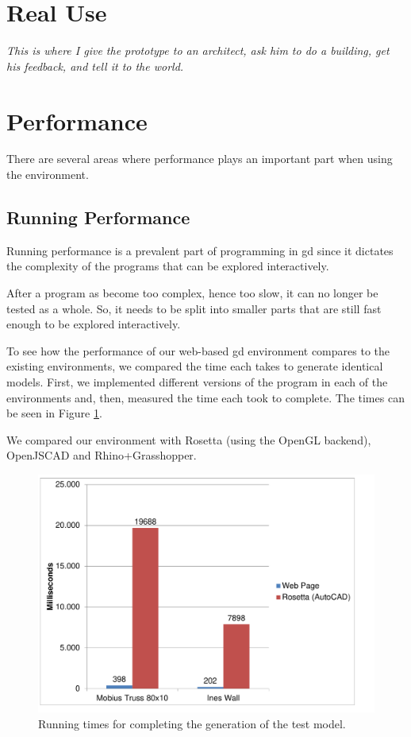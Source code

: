 \section{Real Use}
{\it This is where I give the prototype to an architect, ask him to do a building, get his feedback, and tell it to the world.}


\section{Performance}
There are several areas where performance plays an important part when using the environment.


\subsection{Running Performance}
Running performance is a prevalent part of programming in \gls{gd} since it dictates the complexity of the programs that can be explored interactively.

After a program as become too complex, hence too slow, it can no longer be tested as a whole.
So, it needs to be split into smaller parts that are still fast enough to be explored interactively.

To see how the performance of our web-based \gls{gd} environment compares to the existing environments, we compared the time each takes to generate identical models.
First, we implemented different versions of the program in each of the environments and, then, measured the time each took to complete.
The times can be seen in Figure \ref{fig:run:timing:chart}.

We compared our environment with Rosetta (using the OpenGL backend), OpenJSCAD and Rhino+Grasshopper.

\begin{figure}
  \centering
  \includegraphics[width=12cm]{./images/run_timing_chart}
  \caption{Running times for completing the generation of the test model.}
  \label{fig:run:timing:chart}
\end{figure}

